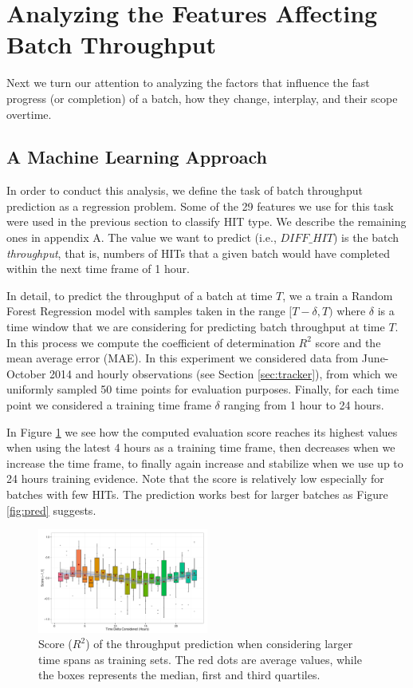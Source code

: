 \section{Analyzing the Features Affecting Batch Throughput}
\label{sec:throughput}
Next we turn our attention to analyzing the factors that influence the fast progress (or completion) of a batch, how they change, interplay, and their scope overtime.
\subsection{A Machine Learning Approach}
In order to conduct this analysis, we define the task of batch throughput prediction as a regression problem.  Some of the  29  features we use for this task were used in the previous section to classify HIT type.  We describe the remaining ones in appendix A. The value  we want to predict (i.e.,   $DIFF\_HIT$) is the batch \emph{throughput}, that is, numbers of HITs that  a given batch would have completed within the next time frame of 1 hour.

In detail, to predict the throughput of a batch at time $T$, we a train a Random Forest Regression model with samples taken in the range $[T-\delta, T)$ where $\delta$ is a time window that we are   considering  for predicting batch throughput at time $T$. In this process we compute the coefficient of determination  $R^2$ score \cite{sklearn,sklearnweb} and the mean average error (MAE).
In this experiment we considered  data from June-October 2014 and hourly observations (see Section \ref{sec:tracker}), from which we uniformly sampled 50 time points for evaluation purposes. Finally, for each time point we considered a training time frame $\delta$ ranging from 1 hour to 24 hours. 

In Figure \ref{fig:accuracy} we see how the computed evaluation score reaches its highest values when using the latest 4 hours as a training time frame, then decreases when we increase the time frame, to finally again increase and stabilize when we use up to 24 hours training evidence.
Note that the score is relatively low especially for batches with few HITs. The prediction works best for larger batches as Figure \ref{fig:pred} suggests.

\begin{figure}[tb]
	\centering
		\includegraphics[width=0.5\textwidth]{figures/ML_accuracy}
	\caption{Score ($R^2$) of the throughput prediction when considering larger time spans as training sets. The red dots are average values, while the boxes represents the median, first and third quartiles.}
	\label{fig:accuracy}
\end{figure}

